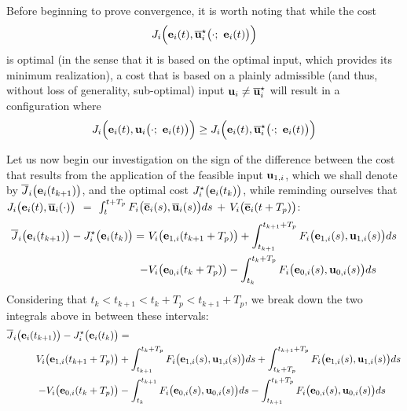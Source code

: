 Before beginning to prove convergence, it is worth noting that while the cost
$$J_i \Big(\vect{e}_i(t), \overline{\vect{u}}_i^{\star}\big(\cdot;\ \vect{e}_i(t)\big)\Big)$$
is optimal (in the sense that it is based on the optimal input, which provides
its minimum realization), a cost that is based on a plainly admissible
(and thus, without loss of generality, sub-optimal) input
$\bm{\mathbf{u}}_i \not= \overline{\bm{\mathbf{u}}}_i^{\star}$ will result in a configuration where
\begin{equation}
J_i \Big(\vect{e}_i(t), \vect{u}_i\big(\cdot;\ \vect{e}_i(t)\big)\Big)
\geq J_i \Big(\vect{e}_i(t), \overline{\vect{u}}_i^{\star}\big(\cdot;\ \vect{e}_i(t)\big)\Big)
\end{equation}

Let us now begin our investigation on the sign of the difference between the cost
that results from the application of the feasible input $\bm{\mathbf{u}}_{1,i}$,
which we shall denote by $\overline{J}_i\big(\bm{\mathbf{e}}_i(t_{k+1})\big)$,
and the optimal cost $J_i^{\star}\big(\bm{\mathbf{e}}_i(t_k)\big)$, while reminding
ourselves that
$J_i \big(\bm{\mathbf{e}}_i(t), \overline{\bm{\mathbf{u}}}_i (\cdot)\big)$ $=$
$\int_{t}^{t + T_p} F_i \big(\overline{\bm{\mathbf{e}}}_i(s), \overline{\bm{\mathbf{u}}}_i (s)\big) ds$ $+$
$V_i \big(\overline{\bm{\mathbf{e}}}_i (t + T_p)\big)$:
\begin{align}
  \overline{J}_i\big(\bm{\mathbf{e}}_i(t_{k+1})\big) - J_i^{\star}\big(\bm{\mathbf{e}}_i(t_k)\big) =\
   & V_i \big(\bm{\mathbf{e}}_{1,i} (t_{k+1} + T_p)\big) + \int_{t_{k+1}}^{t_{k+1} + T_p} F_i \big(\bm{\mathbf{e}}_{1,i}(s), \bm{\mathbf{u}}_{1,i} (s)\big) ds \\
  -&V_i \big(\bm{\mathbf{e}}_{0,i} (t_k + T_p)\big) - \int_{t_k}^{t_k + T_p} F_i \big(\bm{\mathbf{e}}_{0,i}(s), \bm{\mathbf{u}}_{0,i} (s)\big) ds
\end{align}
Considering that $t_k < t_{k+1} < t_k + T_p < t_{k+1} + T_p$, we break down the
two integrals above in between these intervals:
\begin{align}
  \overline{J}_i\big(\bm{\mathbf{e}}_i(t_{k+1})\big) - J_i^{\star}\big(\bm{\mathbf{e}}_i(t_k)\big) &= \\
    V_i \big(\bm{\mathbf{e}}_{1,i} (t_{k+1} + T_p)\big)
    &+ \int_{t_{k+1}}^{t_k + T_p} F_i \big(\bm{\mathbf{e}}_{1,i}(s), \bm{\mathbf{u}}_{1,i} (s)\big) d s
    + \int_{t_k + T_p}^{t_{k+1} + T_p} F_i \big(\bm{\mathbf{e}}_{1,i}(s), \bm{\mathbf{u}}_{1,i} (s)\big) d s \\
    -V_i \big(\bm{\mathbf{e}}_{0,i} (t_k + T_p)\big)
    &- \int_{t_k}^{t_{k+1}} F_i \big(\bm{\mathbf{e}}_{0,i}(s), \bm{\mathbf{u}}_{0,i} (s)\big) d s
    - \int_{t_{k+1}}^{t_k + T_p} F_i \big(\bm{\mathbf{e}}_{0,i}(s), \bm{\mathbf{u}}_{0,i} (s)\big) d s
\label{eq:convergence_4_integrals_2}
\end{align}



